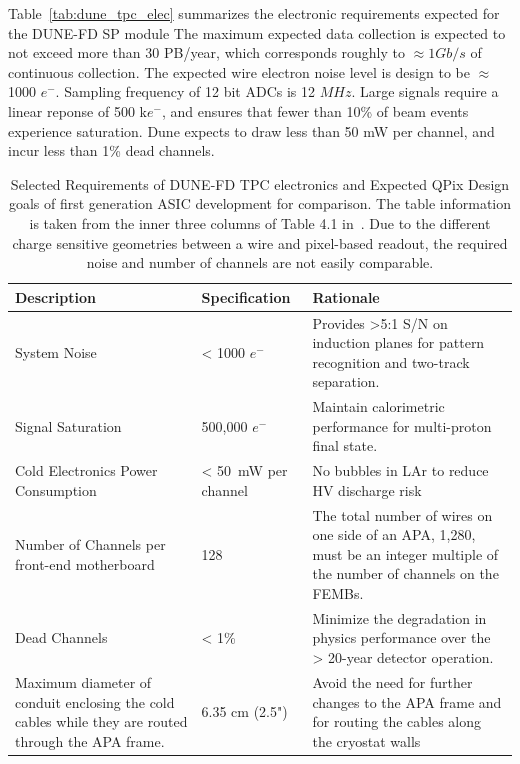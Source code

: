 Table~\ref{tab:dune_tpc_elec} summarizes the electronic requirements expected for the DUNE-FD SP module
The maximum expected data collection is expected to not exceed more than 30 PB/year, which corresponds roughly to $\approx 1 Gb/s$ of continuous collection.
The expected wire electron noise level is design to be $\approx$ 1000 $e^{-}$.
Sampling frequency of 12 bit ADCs is 12 $\unit{MHz}$.
Large signals require a linear reponse of 500 k$e^{-}$, and ensures that fewer than 10\% of beam events experience saturation.
Dune expects to draw less than 50 mW per channel, and incur less than 1\% dead channels.

\begin{table}
\begin{center}
\begin{tabular}{|| p{50mm} | p{40mm} | p{60mm} ||}
 \hline
 Description & Specification & Rationale \\ [0.5ex]
 \hline\hline
  System Noise & < 1000 $e^{-}$ & Provides >5:1 S/N on induction planes for pattern recognition and two-track separation. \\
 \hline
  Signal Saturation & 500,000 $e^{-}$ & Maintain calorimetric performance for multi-proton final state. \\
 \hline
  Cold Electronics Power Consumption & < 50~\unit{mW} per channel & No bubbles in LAr to reduce HV discharge risk\\
 \hline
  Number of Channels per front-end motherboard & 128 &  The total number of wires on one side of an APA, 1,280, must be an integer multiple of the number of channels on the FEMBs. \\
 \hline
  Dead Channels & < 1\% & Minimize the degradation in physics performance over the > 20-year detector operation. \\
 \hline
  Maximum diameter of conduit enclosing the cold cables while they are routed through the APA frame. & 6.35 cm (2.5") & Avoid the need for further changes to the APA frame and for routing the cables along the cryostat walls \\
 \hline
\end{tabular}
\caption{Selected Requirements of DUNE-FD TPC electronics and Expected QPix Design goals of first generation ASIC development for comparison.
The table information is taken from the inner three columns of Table 4.1 in~\citep{DUNE-FD_TDRv4:Abi_2020}.
Due to the different charge sensitive geometries between a wire and pixel-based readout, the required noise and number of channels are not easily comparable.
}
\end{center}
\end{table}~\label{tab:dune_tpc_elec}

